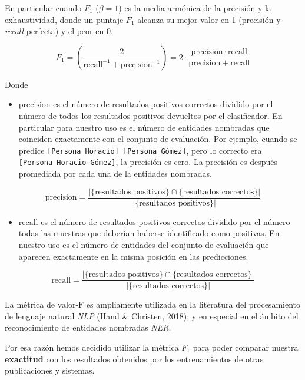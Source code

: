 \documentclass[12pt,a4paper,]{scrartcl}
\providecommand{\tightlist}{%
  \setlength{\itemsep}{0pt}\setlength{\parskip}{0pt}}
\begin{document}
En particular cuando \(F_1\) (\(\beta = 1\)) es la media armónica de la precisión y la exhaustividad, donde un puntaje \(F_1\) alcanza su mejor valor en 1 (precisión y \emph{recall} perfecta) y el peor en 0.

\[
F_1 = \left(\frac{2}{\mathrm{recall}^{-1} + \mathrm{precision}^{-1}}\right) = 2 \cdot \frac{\mathrm{precision} \cdot \mathrm{recall}}{\mathrm{precision} + \mathrm{recall}}
\]

Donde

\begin{itemize}
\tightlist
\item
  \(\text{precision}\) es el número de resultados positivos correctos dividido por el número de todos los resultados positivos devueltos por el clasificador.
  En particular para nuestro uso es el número de entidades nombradas que coinciden exactamente con el conjunto de evaluación.
  Por ejemplo, cuando se predice \texttt{{[}Persona\ Horacio{]}\ {[}Persona\ Gómez{]}}, pero lo correcto era \texttt{{[}Persona\ Horacio\ Gómez{]}}, la precisión es cero. La precisión es después promediada por cada una de la entidades nombradas.
\end{itemize}

\[
\text{precision}=\frac{|\{\text{resultados positivos}\}\cap\{\text{resultados correctos}\}|}{|\{\text{resultados positivos}\}|}
\]

\begin{itemize}
\tightlist
\item
  \(\text{recall}\) es el número de resultados positivos correctos dividido por el número todas las muestras que deberían haberse identificado como positivas.
  En nuestro uso es el número de entidades del conjunto de evaluación que aparecen exactamente en la misma posición en las predicciones.
\end{itemize}

\[
\text{recall}=\frac{|\{\text{resultados positivos}\}\cap\{\text{resultados correctos}\}|}{|\{\text{resultados correctos}\}|}
\]

La métrica de \(\text{valor-F}\) es ampliamente utilizada en la literatura del procesamiento de lenguaje natural \emph{NLP} (Hand \& Christen, \protect\hyperlink{ref-pub_1084928040}{2018}); y en especial en el ámbito del reconocimiento de entidades nombradas \emph{NER}.

Por esa razón hemos decidido utilizar la métrica \(F_1\) para poder comparar nuestra \textbf{exactitud} con los resultados obtenidos por los entrenamientos de otras publicaciones y sistemas.
\end{document}
